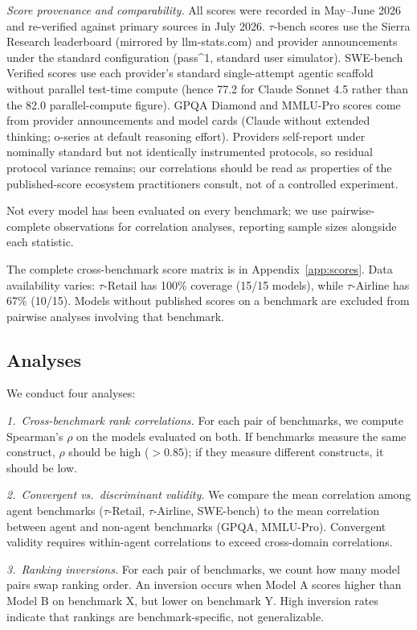 \documentclass[11pt]{article}
\begin{document}
\textit{Score provenance and comparability.} All scores were recorded in May--June 2026 and re-verified against primary sources in July 2026. $\tau$-bench scores use the Sierra Research leaderboard (mirrored by llm-stats.com) and provider announcements under the standard configuration (pass\textasciicircum{}1, standard user simulator). SWE-bench Verified scores use each provider's standard single-attempt agentic scaffold without parallel test-time compute (hence 77.2 for Claude Sonnet 4.5 rather than the 82.0 parallel-compute figure). GPQA Diamond and MMLU-Pro scores come from provider announcements and model cards (Claude without extended thinking; o-series at default reasoning effort). Providers self-report under nominally standard but not identically instrumented protocols, so residual protocol variance remains; our correlations should be read as properties of the published-score ecosystem practitioners consult, not of a controlled experiment.

Not every model has been evaluated on every benchmark; we use pairwise-complete observations for correlation analyses, reporting sample sizes alongside each statistic.

The complete cross-benchmark score matrix is in Appendix~\ref{app:scores}. Data availability varies: $\tau$-Retail has 100\% coverage (15/15 models), while $\tau$-Airline has 67\% (10/15). Models without published scores on a benchmark are excluded from pairwise analyses involving that benchmark.

\subsection{Analyses}
We conduct four analyses:

\textit{1.~Cross-benchmark rank correlations.} For each pair of benchmarks, we compute Spearman's $\rho$ on the models evaluated on both. If benchmarks measure the same construct, $\rho$ should be high ($> 0.85$); if they measure different constructs, it should be low.

\textit{2.~Convergent vs.\ discriminant validity.} We compare the mean correlation among agent benchmarks ($\tau$-Retail, $\tau$-Airline, SWE-bench) to the mean correlation between agent and non-agent benchmarks (GPQA, MMLU-Pro). Convergent validity requires within-agent correlations to exceed cross-domain correlations.

\textit{3.~Ranking inversions.} For each pair of benchmarks, we count how many model pairs swap ranking order. An inversion occurs when Model A scores higher than Model B on benchmark X, but lower on benchmark Y. High inversion rates indicate that rankings are benchmark-specific, not generalizable.
\end{document}
